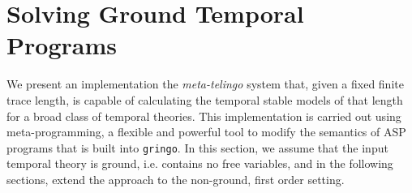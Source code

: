 \section{Solving Ground Temporal Programs}\label{sec:ground}

We present an implementation the \emph{meta-telingo} system that,
given a fixed finite trace length, is capable of calculating the
temporal stable models of that length for a broad class of temporal
theories. This implementation is carried out using meta-programming, a
flexible and powerful tool to modify the semantics of ASP programs
\cite{karoscwa21a} \cite{gepuscto08a} \cite{eifalepf03a} that is built
into \verb|gringo|. In this section, we assume that the input temporal
theory is ground, i.e. contains no free variables, and in the
following sections, extend the approach to the non-ground, first order
setting.







